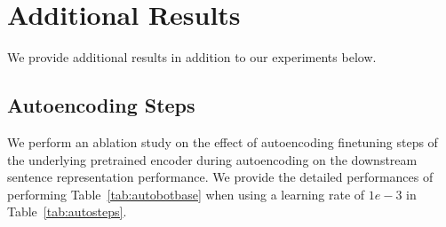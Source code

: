

\section{Additional Results}
We provide additional results in addition to our experiments below.

\subsection{Autoencoding Steps}

We perform an ablation study on the effect of autoencoding finetuning steps of the underlying pretrained encoder during autoencoding on the downstream sentence representation performance. We provide the detailed performances of performing Table~\ref{tab:autobotbase} when using a learning rate of $1e-3$ in Table~\ref{tab:autosteps}.

